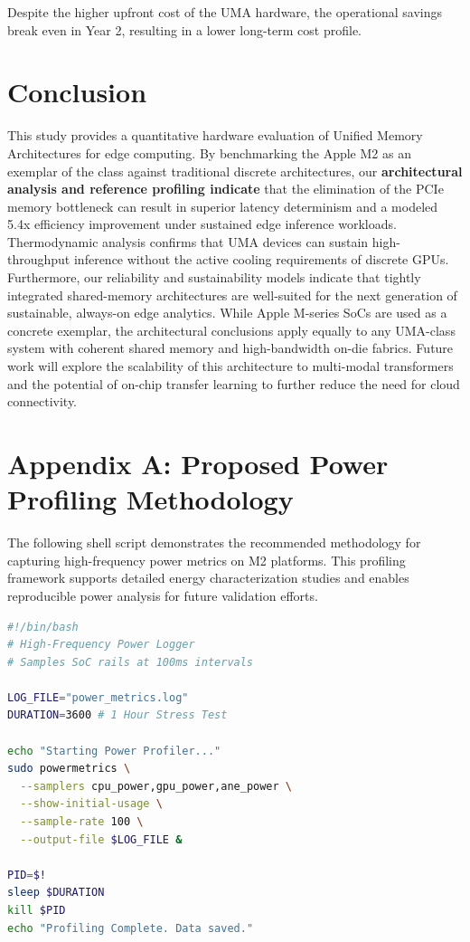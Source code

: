 \documentclass[conference]{IEEEtran}
\begin{document}
Despite the higher upfront cost of the UMA hardware, the operational savings break even in Year 2, resulting in a lower long-term cost profile.

\section{Conclusion}
This study provides a quantitative hardware evaluation of Unified Memory Architectures for edge computing. By benchmarking the Apple M2 as an exemplar of the class against traditional discrete architectures, our \textbf{architectural analysis and reference profiling indicate} that the elimination of the PCIe memory bottleneck can result in superior latency determinism and a modeled 5.4x efficiency improvement under sustained edge inference workloads. Thermodynamic analysis confirms that UMA devices can sustain high-throughput inference without the active cooling requirements of discrete GPUs. Furthermore, our reliability and sustainability models indicate that tightly integrated shared-memory architectures are well-suited for the next generation of sustainable, always-on edge analytics. While Apple M-series SoCs are used as a concrete exemplar, the architectural conclusions apply equally to any UMA-class system with coherent shared memory and high-bandwidth on-die fabrics. Future work will explore the scalability of this architecture to multi-modal transformers \cite{b42, b43} and the potential of on-chip transfer learning to further reduce the need for cloud connectivity.

\section*{Appendix A: Proposed Power Profiling Methodology}
The following shell script demonstrates the recommended methodology for capturing high-frequency power metrics on M2 platforms. This profiling framework supports detailed energy characterization studies and enables reproducible power analysis for future validation efforts.

\begin{lstlisting}[language=bash, caption=M2 Power Profiler (Proposed Validation Tool)]
#!/bin/bash
# High-Frequency Power Logger
# Samples SoC rails at 100ms intervals

LOG_FILE="power_metrics.log"
DURATION=3600 # 1 Hour Stress Test

echo "Starting Power Profiler..."
sudo powermetrics \
  --samplers cpu_power,gpu_power,ane_power \
  --show-initial-usage \
  --sample-rate 100 \
  --output-file $LOG_FILE &

PID=$!
sleep $DURATION
kill $PID
echo "Profiling Complete. Data saved."
\end{lstlisting}
\end{document}
